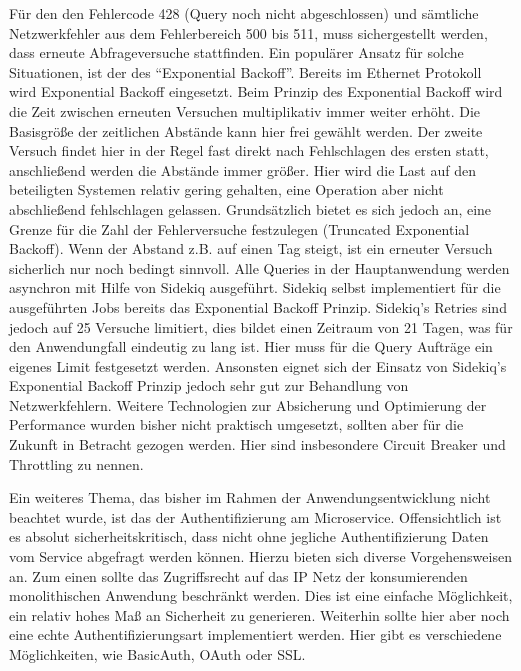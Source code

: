 Für den den Fehlercode 428 (Query noch nicht abgeschlossen) und sämtliche Netzwerkfehler aus dem Fehlerbereich 500 bis 511, muss sichergestellt werden, dass erneute Abfrageversuche stattfinden.
Ein populärer Ansatz für solche Situationen, ist der des ``Exponential Backoff''\cite{expbackoff}. Bereits im Ethernet Protokoll wird Exponential Backoff eingesetzt\cite{etherbackoff}. Beim Prinzip des Exponential Backoff wird die Zeit zwischen erneuten Versuchen multiplikativ immer weiter erhöht. Die Basisgröße der zeitlichen Abstände kann hier frei gewählt werden. Der zweite Versuch findet hier in der Regel fast direkt nach Fehlschlagen des ersten statt, anschließend werden die Abstände immer größer. Hier wird die Last auf den beteiligten Systemen relativ gering gehalten, eine Operation aber nicht abschließend fehlschlagen gelassen. Grundsätzlich bietet es sich jedoch an, eine Grenze für die Zahl der Fehlerversuche festzulegen (Truncated Exponential Backoff). Wenn der Abstand z.B. auf einen Tag steigt, ist ein erneuter Versuch sicherlich nur noch bedingt sinnvoll.
Alle Queries in der Hauptanwendung werden asynchron mit Hilfe von Sidekiq\cite{sidekiq} ausgeführt. Sidekiq selbst implementiert für die ausgeführten Jobs bereits das Exponential Backoff Prinzip. Sidekiq's Retries sind jedoch auf 25 Versuche limitiert, dies bildet einen Zeitraum von 21 Tagen\cite{sidekiq:errors}, was für den Anwendungfall eindeutig zu lang ist. Hier muss für die Query Aufträge ein eigenes Limit festgesetzt werden. Ansonsten eignet sich der Einsatz von Sidekiq's Exponential Backoff Prinzip jedoch sehr gut zur Behandlung von Netzwerkfehlern. 
Weitere Technologien zur Absicherung und Optimierung der Performance wurden bisher nicht praktisch umgesetzt, sollten aber für die Zukunft in Betracht gezogen werden. Hier sind insbesondere Circuit Breaker\cite{MSDN:Circuit}\cite{Fowler:Circuit} und Throttling\cite{MSDN:Throttling} zu nennen.

Ein weiteres Thema, das bisher im Rahmen der Anwendungsentwicklung nicht beachtet wurde, ist das der Authentifizierung am Microservice. Offensichtlich ist es absolut sicherheitskritisch, dass nicht ohne jegliche Authentifizierung Daten vom Service abgefragt werden können. Hierzu bieten sich diverse Vorgehensweisen an. Zum einen sollte das Zugriffsrecht auf das IP Netz der konsumierenden monolithischen Anwendung beschränkt werden. Dies ist eine einfache Möglichkeit, ein relativ hohes Maß an Sicherheit zu generieren. Weiterhin sollte hier aber noch eine echte Authentifizierungsart implementiert werden. Hier gibt es verschiedene Möglichkeiten, wie BasicAuth, OAuth oder SSL\cite{microauth}.

